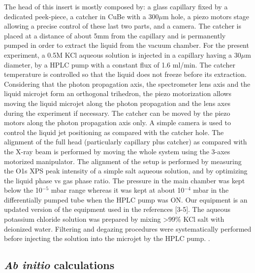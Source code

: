 The head of this insert is mostly composed by: a glass capillary fixed by a dedicated peek-piece, a catcher in CuBe with a 300$\mu$m hole, a piezo motors stage allowing a precise control of these last two parts, and a camera. The catcher is placed at a distance of about 5mm from the capillary and is permanently pumped in order to extract the liquid from the vacuum chamber. For the present experiment, a 0.5M KCl aqueous solution is injected in a capillary having a 30$\mu$m diameter, by a HPLC pump with a constant flux of 1.6 ml/min. The catcher temperature is controlled so that the liquid does not freeze before its extraction. Considering that the photon propagation axis, the spectrometer lens axis and the liquid microjet form an orthogonal trihedron, the piezo motorization allows moving the liquid microjet along the photon propagation and the lens axes during the experiment if necessary. The catcher can be moved by the piezo motors along the photon propagation axis only. A simple camera is used to control the liquid jet positioning as compared with the catcher hole. The alignment of the full head (particularly capillary plus catcher) as compared with the X-ray beam is performed by moving the whole system using the 3-axes motorized manipulator. The alignment of the setup is performed by measuring the O1s XPS peak intensity of a simple salt aqueous solution, and by optimizing the liquid phase vs gas phase ratio. The pressure in the main chamber was kept below the 10$^{-5}$ mbar range whereas it was kept at about 10$^{-4}$ mbar in the differentially pumped tube when the HPLC pump was ON. Our equipment is an updated version of the equipment used in the references [3-5]. The aqueous potassium chloride solution was prepared by mixing >99\% KCl salt with deionized water. Filtering and degazing procedures were systematically performed before injecting the solution into the microjet by the HPLC pump. . 


\subsection{{\bf{\it Ab initio}} calculations}

